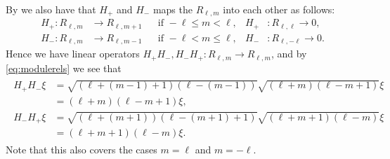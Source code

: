 By  we also have that $H_+$ and $H_-$ maps the $R_{\ell,m}$ into each other as follows:
\begin{align*}
  H_+\colon R_{\ell,m} &\to R_{\ell,m+1} && \mbox{if }-\ell\leq m<\ell, & H_+&\colon R_{\ell,\ell} \to 0, \\
  H_-\colon R_{\ell,m} &\to R_{\ell,m-1} && \mbox{if }-\ell< m\leq \ell, & H_-&\colon R_{\ell,-\ell} \to 0.
\end{align*}
Hence we have linear operators $H_+H_-,H_-H_+\colon R_{\ell,m}\to R_{\ell,m}$, and by \cref{eq:modulerels} we see that
\begin{align}
  \begin{split} \label{eq:H+H-}
    H_+H_-\xi &= \sqrt{(\ell+(m-1)+1)(\ell-(m-1))}\sqrt{(\ell+m)(\ell-m+1)} \xi \\
    &= (\ell+m)(\ell-m+1)\xi, \\
    H_-H_+\xi &= \sqrt{(\ell+(m+1))(\ell-(m+1)+1)}\sqrt{(\ell+m+1)(\ell-m)} \xi \\
    &= (\ell+m+1)(\ell-m)\xi.
  \end{split}
\end{align}
Note that this also covers the cases $m=\ell$ and $m=-\ell$. 

